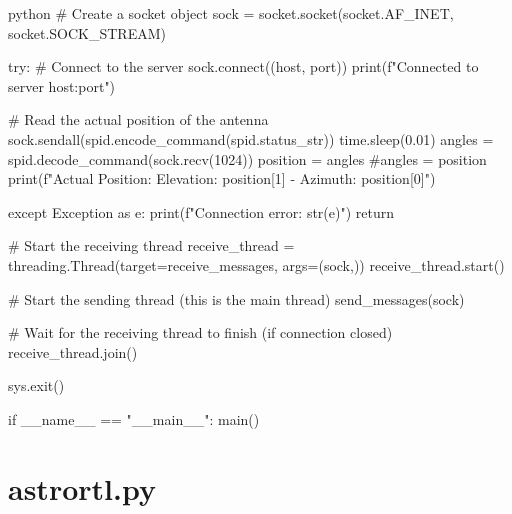 \begin{sourcecode}[]{python}{}
    # Create a socket object
    sock = socket.socket(socket.AF_INET, socket.SOCK_STREAM)

    try:
        # Connect to the server
        sock.connect((host, port))
        print(f"Connected to server {host}:{port}")

        # Read the actual position of the antenna
        sock.sendall(spid.encode_command(spid.status_str))
        time.sleep(0.01)
        angles = spid.decode_command(sock.recv(1024))
        position = angles
        #angles = position
        print(f"Actual Position: Elevation: {position[1]} - Azimuth: {position[0]}")
    
    except Exception as e:
        print(f"Connection error: {str(e)}")
        return

    # Start the receiving thread
    receive_thread = threading.Thread(target=receive_messages, args=(sock,))
    receive_thread.start()

    # Start the sending thread (this is the main thread)
    send_messages(sock)

    # Wait for the receiving thread to finish (if connection closed)
    receive_thread.join()

    sys.exit()

if __name__ == "__main__":
    main()


\end{sourcecode}

\section*{astrortl.py}

